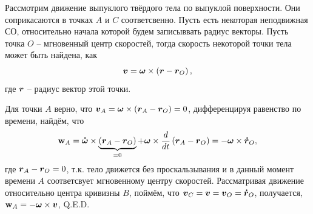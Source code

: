 \begin{figure}
  \begin{center}
      \vspace{-50mm}
  \end{center}
\end{figure}

Рассмотрим движение выпуклого твёрдого тела по выпуклой поверхности. Они соприкасаются в точках $A$ и $C$ соответсвенно. Пусть есть некоторая неподвижная СО, относительно начала которой будем записыввать радиус векторы. Пусть точка $O$ -- мгновенный центр скоростей, тогда скорость некоторой точки тела может быть найдена, как
$$
    \mbox{\boldmath $v$} = \mbox{\boldmath $\omega$} \times \left(
        \mbox{\boldmath $r$} - \mbox{\boldmath $r$}_O
    \right),
$$
где $\mbox{\boldmath $r$}$ -- радиус вектор этой точки.

Для точки $A$ верно, что $\mbox{\boldmath $v$}_A = \mbox{\boldmath $\omega$} \times \left(\mbox{\boldmath $r$}_A - \mbox{\boldmath $r$}_O\right) = 0$, дифференцируя равенство по времени, найдём, что
$$
    \mbox{\boldmath $\mathrm{w}$}_A = \mbox{\boldmath $\dot{\omega}$} \times \underbrace{\left(\mbox{\boldmath $r$}_A - \mbox{\boldmath $r$}_O\right)}_{= 0} + \mbox{\boldmath $\omega$} \times \frac{d}{dt} \left(\mbox{\boldmath $r$}_{A}- \mbox{\boldmath $r$}_O\right) =
    - \mbox{\boldmath $\omega$} \times \mbox{\boldmath $\dot{r}$}_O,
$$
где $\mbox{\boldmath $r$}_A - \mbox{\boldmath $r$}_O = 0$, т.к. тело движется без проскальзывания и в данный момент времени $A$ соответсвует мгновенному центру скоростей.
Рассматривая движение относительно центра кривизны $B$, поймём, что $\mbox{\boldmath $v$}_C = \mbox{\boldmath $v$} = \mbox{\boldmath $v$}_O = \mbox{\boldmath $\dot{r}$}_O$, получается, $\mbox{\boldmath $\mathrm{w}$}_A = - \mbox{\boldmath $\omega$} \times \mbox{\boldmath $v$}$, Q.E.D.